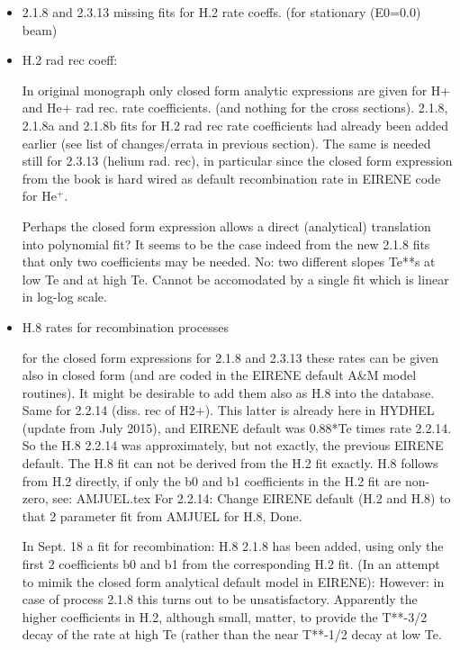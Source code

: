 \documentclass[12pt,dvipdfmx]{article}
\begin{document}
\begin{itemize}
\item {2.1.8  and 2.3.13 missing fits for H.2 rate coeffs. (for stationary (E0=0.0) beam)}

\item {H.2 rad rec coeff:}

In original monograph only closed form analytic expressions are given for H+ and He+ rad rec. rate coefficients.
(and nothing for the cross sections).
2.1.8, 2.1.8a and 2.1.8b fits for H.2 rad rec rate coefficients had already been added earlier (see list of changes/errata in previous section).
The same is needed still for
2.3.13 (helium rad. rec), in particular since the closed form
expression from the book is hard wired as default recombination rate in EIRENE code for He$^+$.

Perhaps the closed form expression allows a direct (analytical)
translation into polynomial fit?
It seems to be the case indeed from
the new 2.1.8 fits that only two coefficients may be needed.
No: two different slopes Te**s at low Te and at high Te. Cannot be accomodated
by a single fit which is linear in log-log scale.

\item {H.8 rates for recombination processes}

for the closed form expressions for 2.1.8 and 2.3.13 these rates can be given also in closed form (and are coded in
the EIRENE default A\&M model routines). It might be desirable to add them also as H.8
into the database. Same for 2.2.14 (diss. rec of H2+).
This latter is already here in HYDHEL (update from July 2015),
and EIRENE default was 0.88*Te times rate 2.2.14.
So the H.8  2.2.14 was approximately, but not exactly, the previous EIRENE default.
The H.8 fit can not be derived from the H.2 fit exactly.
H.8 follows from H.2 directly, if only the b0 and b1 coefficients in the H.2 fit are non-zero, see: AMJUEL.tex
For 2.2.14: Change EIRENE default (H.2 and H.8) to that 2 parameter fit
from AMJUEL for H.8, Done.

In Sept. 18  a fit for recombination: H.8 2.1.8 has been added, using only the first 2 coefficients b0 and b1 from
the corresponding H.2 fit. (In an attempt to mimik the closed form analytical default model in EIRENE):
However: in case of process 2.1.8 this turns out to be unsatisfactory.
Apparently the higher coefficients in H.2, although small, matter, to provide the
T**-3/2 decay of the rate at high Te (rather than the near T**-1/2 decay at low Te.



\end{itemize}
\end{document}
